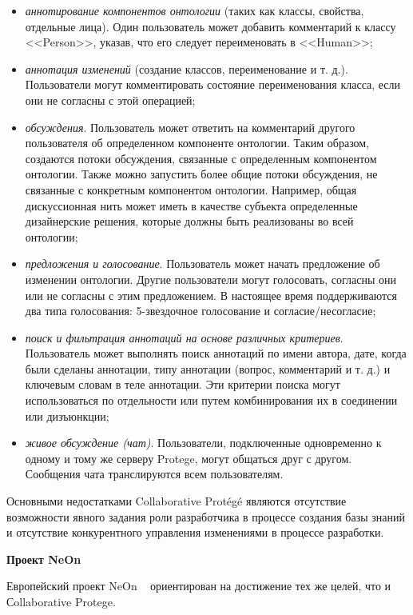 \begin{itemize}
    \item \textit{аннотирование компонентов онтологии} (таких как классы, свойства, отдельные лица). Один пользователь может добавить комментарий к классу <<Person>>, указав, что его следует переименовать в <<Human>>;
    \item \textit{аннотация изменений} (создание классов, переименование и т. д.). Пользователи могут комментировать состояние переименования класса, если они не согласны с этой операцией;
    \item \textit{обсуждения}. Пользователь может ответить на комментарий другого пользователя об определенном компоненте онтологии. Таким образом, создаются потоки обсуждения, связанные с определенным компонентом онтологии. Также можно запустить более общие потоки обсуждения, не связанные с конкретным компонентом онтологии. Например, общая дискуссионная нить может иметь в качестве субъекта определенные дизайнерские решения, которые должны быть реализованы во всей онтологии;
    \item \textit{предложения и голосование}. Пользователь может начать предложение об изменении онтологии. Другие пользователи могут голосовать, согласны они или не согласны с этим предложением. В настоящее время поддерживаются два типа голосования: 5-звездочное голосование и согласие/несогласие;
    \item \textit{поиск и фильтрация аннотаций на основе различных критериев}. Пользователь может выполнять поиск аннотаций по имени автора, дате, когда были сделаны аннотации, типу аннотации (вопрос, комментарий и т. д.) и ключевым словам в теле аннотации. Эти критерии поиска могут использоваться по отдельности или путем комбинирования их в соединении или дизъюнкции;
    \item \textit{живое обсуждение (чат)}. Пользователи, подключенные одновременно к одному и тому же серверу Protege, могут общаться друг с другом. Сообщения чата транслируются всем пользователям.
\end{itemize}

Основными недостатками Collaborative Protégé являются отсутствие возможности явного задания роли разработчика в процессе создания базы знаний и отсутствие конкурентного управления изменениями в процессе разработки.

\textbf{Проект NeOn}

Европейский проект NeOn ~\cite{Gomez2009} ориентирован на достижение тех же целей, что и Сollaborative Protege.

